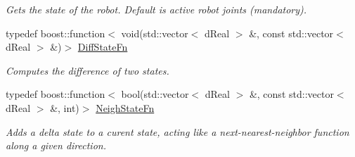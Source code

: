 \begin{DoxyCompactItemize}
\begin{DoxyCompactList}\small\item\em Gets the state of the robot. Default is active robot joints (mandatory). \item\end{DoxyCompactList}\item 
typedef boost::function$<$ void(std::vector$<$ dReal $>$ \&, const std::vector$<$ dReal $>$ \&)$>$ \hyperlink{classOpenRAVE_1_1PlannerBase_1_1PlannerParameters_a58f093aece5495e4be24da19e9cb4cc7}{DiffStateFn}
\begin{DoxyCompactList}\small\item\em Computes the difference of two states. \item\end{DoxyCompactList}\item 
typedef boost::function$<$ bool(std::vector$<$ dReal $>$ \&, const std::vector$<$ dReal $>$ \&, int)$>$ \hyperlink{classOpenRAVE_1_1PlannerBase_1_1PlannerParameters_a602e68d3c6c25efa6539bbd8b5e02c39}{NeighStateFn}
\begin{DoxyCompactList}\small\item\em Adds a delta state to a curent state, acting like a next-\/nearest-\/neighbor function along a given direction. \item\end{DoxyCompactList}\end{DoxyCompactItemize}
